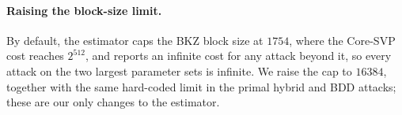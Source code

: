 \paragraph{Raising the block-size limit.} By default, the estimator caps the BKZ block size at $1754$, where the Core-SVP cost
reaches $2^{512}$, and reports an infinite cost for any attack beyond it, so every attack on the two largest \kaiburr parameter sets is
infinite. We raise the cap to $16384$, together with the same hard-coded limit in the primal hybrid and BDD attacks; these are our
only changes to the estimator.
